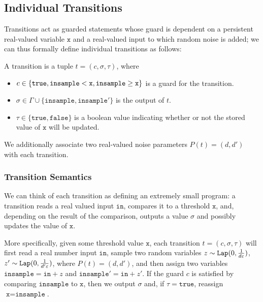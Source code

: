 
\subsection{Individual Transitions}

Transitions act as guarded statements whose guard is dependent on a persistent real-valued variable $\texttt{x}$ and a real-valued input to which random noise is added; we can thus formally define individual transitions as follows:

\begin{defn}[Transitions]
    A transition is a tuple $t = (c, \sigma, \tau)$, where \begin{itemize}
        \item $c\in \{\texttt{true}, \lguard[\texttt{x}], \gguard[\texttt{x}]\}$ is a guard for the transition.
        \item $\sigma \in \Gamma\cup\{\texttt{insample}, \texttt{insample}'\}$ is the output of $t$.
        \item $\tau\in\{\texttt{true}, \texttt{false}\}$ is a boolean value indicating whether or not the stored value of $\texttt{x}$ will be updated.
    \end{itemize}
\end{defn}

We additionally associate two real-valued noise parameters $P(t) = (d, d')$ with each transition. 

\subsubsection{Transition Semantics}

We can think of each transition as defining an extremely small program: a transition reads a real valued input $\texttt{in}$, compares it to a threshold $\texttt{x}$, and, depending on the result of the comparison, outputs a value $\sigma$ and possibly updates the value of $\texttt{x}$.

More specifically, given some threshold value $\texttt{x}$, each transition $t = (c, \sigma, \tau)$ will first read a real number input $\texttt{in}$, sample two random variables $z\sim\Lap(0, \frac{1}{d\varepsilon})$, $z'\sim\Lap(0, \frac{1}{d'\varepsilon})$, where $P(t) = (d, d')$, and then assign two variables $\texttt{insample} = \texttt{in} + z$ and $\texttt{insample}' = \texttt{in} + z'$. 
If the guard $c$ is satisfied by comparing $\texttt{insample}$ to $\texttt{x}$, then we output $\sigma$ and, if $\tau = \texttt{true}$, reassign $\texttt{x} = \texttt{insample}$. 

